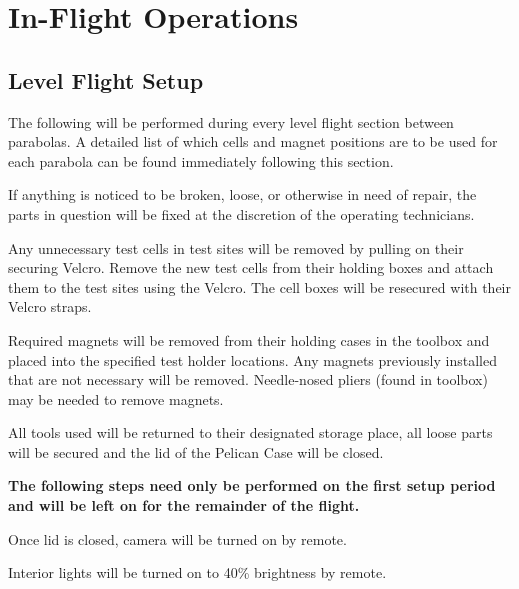 \newpage{}
\section{In-Flight Operations}
\subsection{Level Flight Setup}
The following will be performed during every level flight section between
parabolas.  A detailed list of which cells and magnet positions
are to be used for each parabola can be found immediately following this
section.
\begin{checklist}
    \item If anything is noticed to be broken, loose, or otherwise in need of repair, the parts in question will be fixed at the discretion of the operating technicians.
    \item Any unnecessary test cells in test sites will be removed by pulling on their securing Velcro.  Remove the new test cells from their holding boxes and attach them to the test sites using the Velcro.  The cell boxes will be resecured with their Velcro straps.
    \item Required magnets will be removed from their holding cases in the toolbox and placed into the specified test holder locations. Any magnets previously installed that are not necessary will be removed.  Needle-nosed pliers (found in toolbox) may be needed to remove magnets.
    \item All tools used will be returned to their designated storage place, all loose parts will be secured and the lid of the Pelican Case will be closed.
\end{checklist}
\textbf{The following steps need only be performed on the first setup period and will be left on for the remainder of the flight.}
\begin{checklist}
    \item Once lid is closed, camera will be turned on by remote.
    \item Interior lights will be turned on to 40\% brightness by remote.
\end{checklist}

